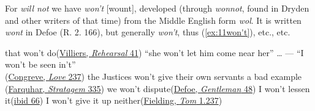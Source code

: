 For \textit{will not} we have \textit{won't} [wount], developed (through \textit{wonnot}, found in Dryden and other writers of that time) from the Middle English form 
\textit{wol}. It is written \textit{wont} in Defoe (R. 2. 166), %
but generally \textit{won't}, thus (\ref{ex:11won't}), etc., etc.

\ea \label{ex:11won't}
\ea
that won't do\hfill(\href{https://archive.org/details/rehearsalwithil00arbegoog/page/n45/mode/2up?q=%22that+won%27t%22&view=theater}{Villiers, \textit{Rehearsal} 41}) %
\ex
``she won’t let him come near her'' {\dots} --- ``I won’t be seen in’t''\\\hfill(\href{https://archive.org/details/in.ernet.dli.2015.219151/page/n171/mode/2up?q=%22won%27t%22&view=theater}{Congreve, \textit{Love} 237}) %
\ex
the Justices won't give their own servants a bad example\\\hfill(\href{https://archive.org/details/beauxstratagema00fitzgoog/page/n79/mode/2up?q=%22won%27t%22&view=theater}{Farquhar, \textit{Stratagem} 335}) %
\ex
we won't dispute\hfill(\href{https://books.google.co.jp/books?hl=ja&id=WopaAAAAMAAJ&q=48#v=snippet&q=%22we%20won't%22&f=false}{Defoe, \textit{Gentleman} 48}) %
\ex
I won't lessen it\hfill(\href{https://books.google.co.jp/books?hl=ja&id=WopaAAAAMAAJ&q=66#v=onepage&q=%22warrant%20I%20won't%22&f=false}{ibid 66}) %
\ex
I won't give it up neither\hfill(\href{https://archive.org/details/bim_eighteenth-century_the-history-of-tom-jones_fielding-henry_1750_1_0/page/240/mode/2up?q=%22won%27t%22&view=theater}{Fielding, \textit{Tom} 1.237}) %
\z
\z

